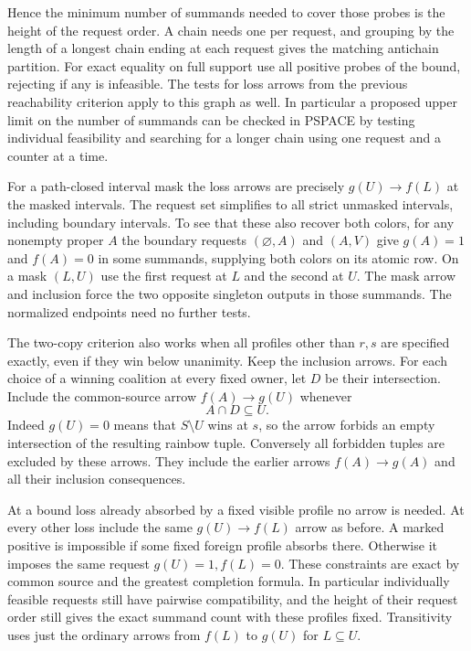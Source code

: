 Hence the minimum number of summands needed to
cover those probes is the height of the request
order. A chain needs one per request, and grouping
by the length of a longest chain ending at each
request gives the matching antichain partition.
For exact equality on full support use all positive
probes of the bound, rejecting if any is infeasible.
The tests for loss arrows from the previous
reachability criterion apply to this graph as well.
In particular a proposed upper limit on the number
of summands can be checked in PSPACE by testing
individual feasibility and searching for a longer
chain using one request and a counter at a time.

For a path-closed interval mask the loss arrows
are precisely $g(U)\to f(L)$ at the masked intervals.
The request set simplifies to all strict unmasked
intervals, including boundary intervals. To see
that these also recover both colors, for any
nonempty proper $A$ the boundary requests
$(\varnothing,A)$ and $(A,V)$ give $g(A)=1$ and
$f(A)=0$ in some summands, supplying both colors
on its atomic row. On a mask $(L,U)$ use the
first request at $L$ and the second at $U$.
The mask arrow and inclusion force the two
opposite singleton outputs in those summands.
The normalized endpoints need no further tests.

The two-copy criterion also works when all profiles
other than $r,s$ are specified exactly, even if they
win below unanimity. Keep the inclusion arrows.
For each choice of a winning coalition at every
fixed owner, let $D$ be their intersection. Include
the common-source arrow $f(A)\to g(U)$ whenever
\[
                      A\cap D\subseteq U .
\]
Indeed $g(U)=0$ means that $S\setminus U$ wins at
$s$, so the arrow forbids an empty intersection of
the resulting rainbow tuple. Conversely all forbidden
tuples are excluded by these arrows. They include
the earlier arrows $f(A)\to g(A)$ and all their
inclusion consequences.

At a bound loss already absorbed by a fixed visible
profile no arrow is needed. At every other loss
include the same $g(U)\to f(L)$ arrow as before.
A marked positive is impossible if some fixed
foreign profile absorbs there. Otherwise it imposes
the same request $g(U)=1,f(L)=0$. These constraints
are exact by common source and the greatest
completion formula. In particular individually
feasible requests still have pairwise compatibility,
and the height of their request order still gives
the exact summand count with these profiles fixed.
Transitivity uses just the ordinary arrows from
$f(L)$ to $g(U)$ for $L\subseteq U$.

